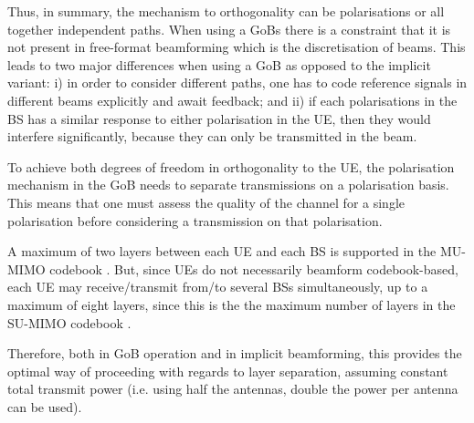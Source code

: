 
Thus, in summary, the mechanism to orthogonality can be polarisations or all together independent paths. When using a GoBs there is a constraint that it is not present in free-format beamforming which is the discretisation of beams. This leads to two major differences when using a GoB as opposed to the implicit variant: i) in order to consider different paths, one has to code reference signals in different beams explicitly and await feedback; and ii) if each polarisations in the BS has a similar response to either polarisation in the UE, then they would interfere significantly, because they can only be transmitted in the beam.

To achieve both degrees of freedom in orthogonality to the UE, the polarisation mechanism in the GoB needs to separate transmissions on a polarisation basis. This means that one must assess the quality of the channel for a single polarisation before considering a transmission on that polarisation. 


A maximum of two layers between each UE and each BS is supported in the MU-MIMO codebook \cite{3gpp-codebooks}. But, since UEs do not necessarily beamform codebook-based, each UE may receive/transmit from/to several BSs simultaneously, up to a maximum of eight layers, since this is the the maximum number of layers in the SU-MIMO codebook \cite{3gpp-codebooks}.


Therefore, both in GoB operation and in implicit beamforming, this provides the optimal way of proceeding with regards to layer separation, assuming constant total transmit power (i.e. using half the antennas, double the power per antenna can be used).


